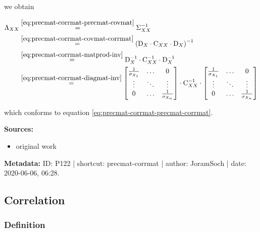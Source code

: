 \documentclass[a4paper,12pt,twoside]{book}
\begin{document}
we obtain

\begin{equation} \label{eq:precmat-corrmat-precmat-corrmat-qed}
\begin{split}
\Lambda_{XX} &\overset{\eqref{eq:precmat-corrmat-precmat-covmat}}{=} \Sigma_{XX}^{-1} \\
&\overset{\eqref{eq:precmat-corrmat-covmat-corrmat}}{=} \left( \mathrm{D}_X \cdot \mathrm{C}_{XX} \cdot \mathrm{D}_X \right)^{-1} \\
&\overset{\eqref{eq:precmat-corrmat-matprod-inv}}{=} \mathrm{D}_X^{-1} \cdot \mathrm{C}_{XX}^{-1} \cdot \mathrm{D}_X^{-1} \\
&\overset{\eqref{eq:precmat-corrmat-diagmat-inv}}{=}
\begin{bmatrix}
\frac{1}{\sigma_{X_1}} & \ldots & 0 \\
\vdots & \ddots & \vdots \\
0 & \ldots & \frac{1}{\sigma_{X_n}}
\end{bmatrix} \cdot
\mathrm{C}_{XX}^{-1} \cdot
\begin{bmatrix}
\frac{1}{\sigma_{X_1}} & \ldots & 0 \\
\vdots & \ddots & \vdots \\
0 & \ldots & \frac{1}{\sigma_{X_n}}
\end{bmatrix}
\end{split}
\end{equation}

which conforms to equation \eqref{eq:precmat-corrmat-precmat-corrmat}.


\vspace{1em}
\textbf{Sources:}
\begin{itemize}
\item original work\end{itemize}


\vspace{1em}
\textbf{Metadata:} ID: P122 | shortcut: precmat-corrmat | author: JoramSoch | date: 2020-06-06, 06:28.
\vspace{1em}



\subsection{Correlation}

\subsubsection[\textit{Definition}]{Definition} \label{sec:corr}
\setcounter{equation}{0}
\end{document}
